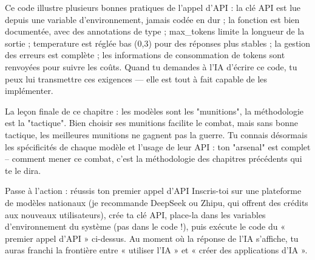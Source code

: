 Ce code illustre plusieurs bonnes pratiques de l'appel d'API : la clé API est lue depuis une variable d'environnement, jamais codée en dur ; la fonction est bien documentée, avec des annotations de type ; max\_tokens limite la longueur de la sortie ; temperature est réglée bas (0,3) pour des réponses plus stables ; la gestion des erreurs est complète ; les informations de consommation de tokens sont renvoyées pour suivre les coûts. Quand tu demandes à l'IA d'écrire ce code, tu peux lui transmettre ces exigences — elle est tout à fait capable de les implémenter.

La leçon finale de ce chapitre : les modèles sont les "munitions", la méthodologie est la "tactique". Bien choisir ses munitions facilite le combat, mais sans bonne tactique, les meilleures munitions ne gagnent pas la guerre. Tu connais désormais les spécificités de chaque modèle et l'usage de leur API : ton "arsenal" est complet – comment mener ce combat, c'est la méthodologie des chapitres précédents qui te le dira.

\begin{tcbpractice}{Passe à l'action : réussis ton premier appel d'API}
Inscris-toi sur une plateforme de modèles nationaux (je recommande DeepSeek ou Zhipu, qui offrent des crédits aux nouveaux utilisateurs), crée ta clé API, place-la dans les variables d'environnement du système (pas dans le code !), puis exécute le code du « premier appel d'API » ci-dessus. Au moment où la réponse de l'IA s'affiche, tu auras franchi la frontière entre « utiliser l'IA » et « créer des applications d'IA ».

\end{tcbpractice}

